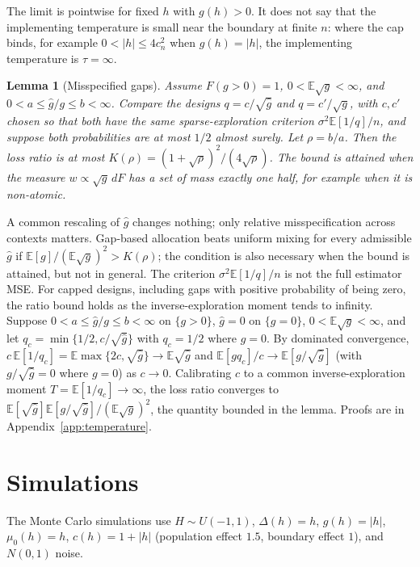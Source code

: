 \documentclass[12pt]{article}
\newtheorem{lemma}{Lemma}
\theoremstyle{definition}
\theoremstyle{remark}
\newcommand{\E}{\mathbb{E}}
\begin{document}
The limit is pointwise for fixed $h$ with $g(h)>0$. It does not say that the
implementing temperature is small near the boundary at finite $n$: where the
cap binds, for example $0<|h|\le4c_n^2$ when $g(h)=|h|$, the implementing
temperature is $\tau=\infty$.

\begin{lemma}[Misspecified gaps]\label{lem:robust}
Assume $F(g>0)=1$, $0<\E\sqrt g<\infty$, and
$0<a\le\hat g/g\le b<\infty$. Compare the designs
$q=c/\sqrt{\hat g}$ and $q=c'/\sqrt g$, with $c,c'$ chosen so that both have
the same sparse-exploration criterion $\sigma^2\E[1/q]/n$, and suppose both
probabilities are at most $1/2$ almost surely. Let $\rho=b/a$. Then the loss ratio is at most
$K(\rho)=(1+\sqrt\rho)^2/(4\sqrt\rho)$. The bound is attained when the measure
$w\propto\sqrt g\,dF$ has a set of mass exactly one half, for example when it
is non-atomic.
\end{lemma}

A common rescaling of $\hat g$ changes nothing; only relative
misspecification across contexts matters. Gap-based allocation beats uniform
mixing for every admissible $\hat g$ if $\E[g]/(\E\sqrt g)^2>K(\rho)$; the
condition is also necessary when the bound is attained, but not in general.
The criterion $\sigma^2\E[1/q]/n$ is not the full estimator MSE.
For capped designs, including gaps with positive probability of being zero,
the ratio bound holds as the inverse-exploration moment tends to infinity. Suppose $0<a\le\hat g/g\le b<\infty$ on $\{g>0\}$, $\hat g=0$ on
$\{g=0\}$, $0<\E\sqrt g<\infty$, and let $q_c=\min\{1/2,c/\sqrt{\hat g}\}$
with $q_c=1/2$ where $\hat g=0$. By dominated convergence,
$c\,\E[1/q_c]=\E\max\{2c,\sqrt{\hat g}\}\to\E\sqrt{\hat g}$ and
$\E[gq_c]/c\to\E[g/\sqrt{\hat g}]$ (with $g/\sqrt{\hat g}=0$ where $g=0$) as
$c\to0$. Calibrating $c$ to a common inverse-exploration moment
$T=\E[1/q_c]\to\infty$,
the loss ratio converges to $\E[\sqrt{\hat g}]\E[g/\sqrt{\hat g}]/(\E\sqrt g)^2$,
the quantity bounded in the lemma.
Proofs are in Appendix~\ref{app:temperature}.

\section{Simulations}\label{sec:sims}

The Monte Carlo simulations use $H\sim U(-1,1)$, $\Delta(h)=h$, $g(h)=|h|$,
$\mu_0(h)=h$, $c(h)=1+|h|$ (population effect $1.5$, boundary effect $1$), and
$N(0,1)$ noise.
\end{document}
